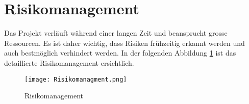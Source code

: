 \section{Risikomanagement}

Das Projekt verläuft während einer langen Zeit und beansprucht grosse Ressourcen. Es ist daher wichtig, dass Risiken frühzeitig erkannt werden und auch bestmöglich verhindert werden. In der folgenden Abbildung \ref{fig::Risikomanagement} ist das detaillierte Risikomanagement ersichtlich.


\begin{figure}[h!] 
\centering
\texttt{[image: Risikomanagment.png]}%
\caption{Risikomanagement}%
\label{fig::Risikomanagement}%
\end{figure}